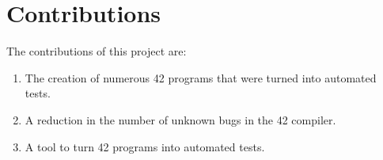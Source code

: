 \section{Contributions}

The contributions of this project are:

\begin{enumerate}
	\item{The creation of numerous 42 programs that were turned into automated tests.}
	\item{A reduction in the number of unknown bugs in the 42 compiler.}
	\item{A tool to turn 42 programs into automated tests.}
\end{enumerate}